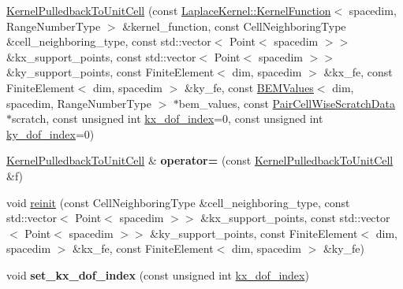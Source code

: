 \begin{DoxyCompactItemize}
\hyperlink{classLaplaceBEM_1_1KernelPulledbackToUnitCell_afd01d1f6655a678124f2d0e3684b419d}{Kernel\+Pulledback\+To\+Unit\+Cell} (const \hyperlink{classLaplaceBEM_1_1LaplaceKernel_1_1KernelFunction}{Laplace\+Kernel\+::\+Kernel\+Function}$<$ spacedim, Range\+Number\+Type $>$ \&kernel\+\_\+function, const Cell\+Neighboring\+Type \&cell\+\_\+neighboring\+\_\+type, const std\+::vector$<$ Point$<$ spacedim $>$$>$ \&kx\+\_\+support\+\_\+points, const std\+::vector$<$ Point$<$ spacedim $>$$>$ \&ky\+\_\+support\+\_\+points, const Finite\+Element$<$ dim, spacedim $>$ \&kx\+\_\+fe, const Finite\+Element$<$ dim, spacedim $>$ \&ky\+\_\+fe, const \hyperlink{classLaplaceBEM_1_1BEMValues}{B\+E\+M\+Values}$<$ dim, spacedim, Range\+Number\+Type $>$ $\ast$bem\+\_\+values, const \hyperlink{structLaplaceBEM_1_1PairCellWiseScratchData}{Pair\+Cell\+Wise\+Scratch\+Data} $\ast$scratch, const unsigned int \hyperlink{classLaplaceBEM_1_1KernelPulledbackToUnitCell_a66ba57ad86025978e5e5580c822aef89}{kx\+\_\+dof\+\_\+index}=0, const unsigned int \hyperlink{classLaplaceBEM_1_1KernelPulledbackToUnitCell_ae6f3e4bc6cf09546bf11d01812f9b692}{ky\+\_\+dof\+\_\+index}=0)
\item 
\mbox{\label{classLaplaceBEM_1_1KernelPulledbackToUnitCell_a1fd71ef63d7bd116cef37b5fe9189c40}} 
\hyperlink{classLaplaceBEM_1_1KernelPulledbackToUnitCell}{Kernel\+Pulledback\+To\+Unit\+Cell} \& {\bfseries operator=} (const \hyperlink{classLaplaceBEM_1_1KernelPulledbackToUnitCell}{Kernel\+Pulledback\+To\+Unit\+Cell} \&f)
\item 
void \hyperlink{classLaplaceBEM_1_1KernelPulledbackToUnitCell_a6c4063a68f9981ed1f2327670c512f59}{reinit} (const Cell\+Neighboring\+Type \&cell\+\_\+neighboring\+\_\+type, const std\+::vector$<$ Point$<$ spacedim $>$$>$ \&kx\+\_\+support\+\_\+points, const std\+::vector$<$ Point$<$ spacedim $>$$>$ \&ky\+\_\+support\+\_\+points, const Finite\+Element$<$ dim, spacedim $>$ \&kx\+\_\+fe, const Finite\+Element$<$ dim, spacedim $>$ \&ky\+\_\+fe)
\item 
\mbox{\label{classLaplaceBEM_1_1KernelPulledbackToUnitCell_a1067e884c01a2f6d4648f9fc08fc2bc2}} 
void {\bfseries set\+\_\+kx\+\_\+dof\+\_\+index} (const unsigned int \hyperlink{classLaplaceBEM_1_1KernelPulledbackToUnitCell_a66ba57ad86025978e5e5580c822aef89}{kx\+\_\+dof\+\_\+index})
\item 
\mbox{\label{classLaplaceBEM_1_1KernelPulledbackToUnitCell_a39ea676a505803290a647c99699b5504}} 

\end{DoxyCompactItemize}
